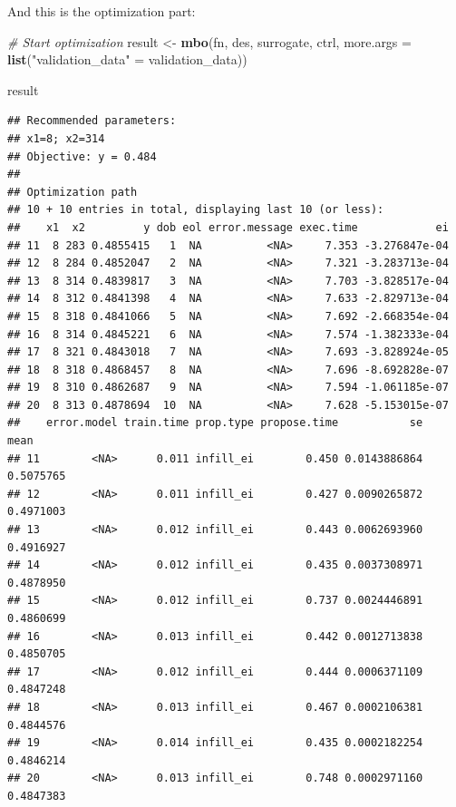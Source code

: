 \documentclass[]{gitbook}
\newenvironment{Shaded}{\begin{snugshade}}{\end{snugshade}}
\newcommand{\CommentTok}[1]{\textcolor[rgb]{0.56,0.35,0.01}{\textit{#1}}}
\newcommand{\DataTypeTok}[1]{\textcolor[rgb]{0.13,0.29,0.53}{#1}}
\newcommand{\KeywordTok}[1]{\textcolor[rgb]{0.13,0.29,0.53}{\textbf{#1}}}
\newcommand{\NormalTok}[1]{#1}
\newcommand{\StringTok}[1]{\textcolor[rgb]{0.31,0.60,0.02}{#1}}
\theoremstyle{definition}
\theoremstyle{definition}
\theoremstyle{definition}
\theoremstyle{remark}
\begin{document}
And this is the optimization part:

\begin{Shaded}
\begin{Highlighting}[]
\CommentTok{# Start optimization}
\NormalTok{result <-}\StringTok{ }\KeywordTok{mbo}\NormalTok{(fn, des, surrogate, ctrl, }\DataTypeTok{more.args =} \KeywordTok{list}\NormalTok{(}\StringTok{"validation_data"}\NormalTok{ =}\StringTok{ }\NormalTok{validation_data))}
\end{Highlighting}
\end{Shaded}

\begin{Shaded}
\begin{Highlighting}[]
\NormalTok{result}
\end{Highlighting}
\end{Shaded}

\begin{verbatim}
## Recommended parameters:
## x1=8; x2=314
## Objective: y = 0.484
## 
## Optimization path
## 10 + 10 entries in total, displaying last 10 (or less):
##    x1  x2         y dob eol error.message exec.time            ei
## 11  8 283 0.4855415   1  NA          <NA>     7.353 -3.276847e-04
## 12  8 284 0.4852047   2  NA          <NA>     7.321 -3.283713e-04
## 13  8 314 0.4839817   3  NA          <NA>     7.703 -3.828517e-04
## 14  8 312 0.4841398   4  NA          <NA>     7.633 -2.829713e-04
## 15  8 318 0.4841066   5  NA          <NA>     7.692 -2.668354e-04
## 16  8 314 0.4845221   6  NA          <NA>     7.574 -1.382333e-04
## 17  8 321 0.4843018   7  NA          <NA>     7.693 -3.828924e-05
## 18  8 318 0.4868457   8  NA          <NA>     7.696 -8.692828e-07
## 19  8 310 0.4862687   9  NA          <NA>     7.594 -1.061185e-07
## 20  8 313 0.4878694  10  NA          <NA>     7.628 -5.153015e-07
##    error.model train.time prop.type propose.time           se      mean
## 11        <NA>      0.011 infill_ei        0.450 0.0143886864 0.5075765
## 12        <NA>      0.011 infill_ei        0.427 0.0090265872 0.4971003
## 13        <NA>      0.012 infill_ei        0.443 0.0062693960 0.4916927
## 14        <NA>      0.012 infill_ei        0.435 0.0037308971 0.4878950
## 15        <NA>      0.012 infill_ei        0.737 0.0024446891 0.4860699
## 16        <NA>      0.013 infill_ei        0.442 0.0012713838 0.4850705
## 17        <NA>      0.012 infill_ei        0.444 0.0006371109 0.4847248
## 18        <NA>      0.013 infill_ei        0.467 0.0002106381 0.4844576
## 19        <NA>      0.014 infill_ei        0.435 0.0002182254 0.4846214
## 20        <NA>      0.013 infill_ei        0.748 0.0002971160 0.4847383
\end{verbatim}
\end{document}
